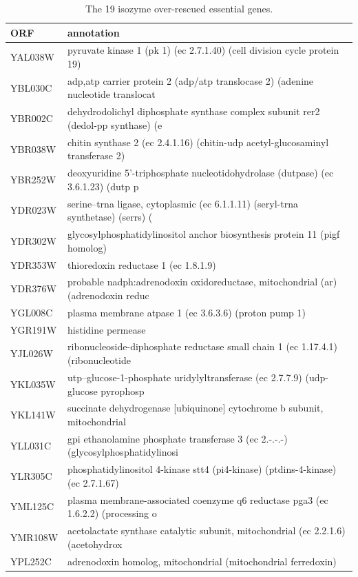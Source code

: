 \begin{longtable}{ll}
\caption{The 19 isozyme over-rescued essential genes.}\label{tab:overrescued}\\
\hline\hline
ORF & annotation\\
\hline
YAL038W & pyruvate kinase 1 (pk 1) (ec 2.7.1.40) (cell division cycle protein 19)\\
YBL030C & adp,atp carrier protein 2 (adp/atp translocase 2) (adenine nucleotide translocat\\
YBR002C & dehydrodolichyl diphosphate synthase complex subunit rer2 (dedol-pp synthase) (e\\
YBR038W & chitin synthase 2 (ec 2.4.1.16) (chitin-udp acetyl-glucosaminyl transferase 2)\\
YBR252W & deoxyuridine 5'-triphosphate nucleotidohydrolase (dutpase) (ec 3.6.1.23) (dutp p\\
YDR023W & serine--trna ligase, cytoplasmic (ec 6.1.1.11) (seryl-trna synthetase) (serrs) (\\
YDR302W & glycosylphosphatidylinositol anchor biosynthesis protein 11 (pigf homolog)\\
YDR353W & thioredoxin reductase 1 (ec 1.8.1.9)\\
YDR376W & probable nadph:adrenodoxin oxidoreductase, mitochondrial (ar) (adrenodoxin reduc\\
YGL008C & plasma membrane atpase 1 (ec 3.6.3.6) (proton pump 1)\\
YGR191W & histidine permease\\
YJL026W & ribonucleoside-diphosphate reductase small chain 1 (ec 1.17.4.1) (ribonucleotide\\
YKL035W & utp--glucose-1-phosphate uridylyltransferase (ec 2.7.7.9) (udp-glucose pyrophosp\\
YKL141W & succinate dehydrogenase [ubiquinone] cytochrome b subunit, mitochondrial\\
YLL031C & gpi ethanolamine phosphate transferase 3 (ec 2.-.-.-) (glycosylphosphatidylinosi\\
YLR305C & phosphatidylinositol 4-kinase stt4 (pi4-kinase) (ptdins-4-kinase) (ec 2.7.1.67)\\
YML125C & plasma membrane-associated coenzyme q6 reductase pga3 (ec 1.6.2.2) (processing o\\
YMR108W & acetolactate synthase catalytic subunit, mitochondrial (ec 2.2.1.6) (acetohydrox\\
YPL252C & adrenodoxin homolog, mitochondrial (mitochondrial ferredoxin)\\
\hline
\end{longtable}
